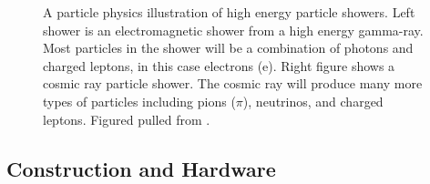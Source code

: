 \begin{figure}
    \caption{A particle physics illustration of high energy particle showers. Left shower is an electromagnetic shower from a high energy gamma-ray. Most particles in the shower will be a combination of photons and charged leptons, in this case electrons (e). Right figure shows a cosmic ray particle shower. The cosmic ray will produce many more types of particles including pions ($\pi$), neutrinos, and charged leptons. Figured pulled from \cite{lopez_thesis}.}
    \label{fig:airshowers}
\end{figure}

\subsection{Construction and Hardware} \label{sec:hawc_hardware}

